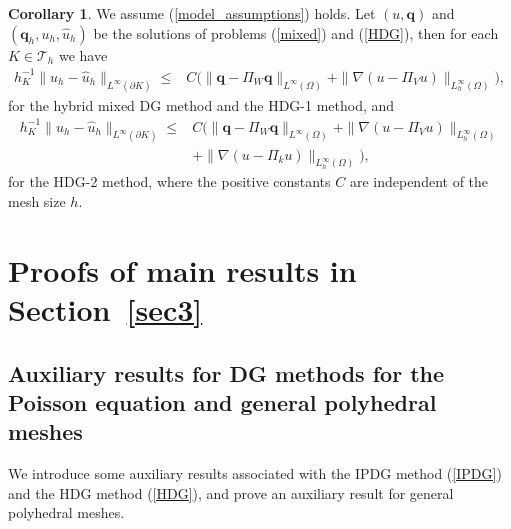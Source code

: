 \documentclass[1996/10/24]{amsart}
\theoremstyle{definition}
\newtheorem{corollary}[theorem]{Corollary}
\numberwithin{equation}{section}
\begin{document}
\begin{corollary}\label{mn-HDG-1}
We assume (\ref{model_assumptions}) holds.
Let $(u,{\bm q})$ and $({\bm q}_h,u_h,\widehat{u}_h)$ be the solutions of problems (\ref{mixed}) and (\ref{HDG}), then for each $K\in\mathcal{T}_h$ we have
\begin{align}
h_K^{-1}\|u_h-\widehat{u}_h\|_{L^{\infty}(\partial K)}\leq & C\Big(\|{\bm q}-\Pi_W{\bm q}\|_{L^{\infty}(\Omega)}
+\|\nabla(u-\Pi_Vu)\|_{L_h^{\infty}(\Omega)}\Big),\label{mn-HDG-1:1}
\end{align}
for the hybrid mixed DG method and the HDG-1 method, and
\begin{align}
h_K^{-1}\|u_h-\widehat{u}_h\|_{L^{\infty}(\partial K)}\leq & C\Big(\|{\bm q}-\Pi_W{\bm q}\|_{L^{\infty}(\Omega)}
+\|\nabla(u-\Pi_Vu)\|_{L_h^{\infty}(\Omega)}\nonumber\\
&+\|\nabla(u-\Pi_ku)\|_{L_h^{\infty}(\Omega)}\Big),\label{mn-HDG-1:2}
\end{align}
for the HDG-2 method, where the positive constants $C$ are independent of the mesh size $h$.
\end{corollary}

\section{Proofs of main results in Section~\ref{sec3}}\label{sec4}

\subsection{Auxiliary results for DG methods for the Poisson equation and general polyhedral meshes}

We introduce some auxiliary results associated with the IPDG method (\ref{IPDG}) and the HDG method (\ref{HDG}),
and prove an auxiliary result for general polyhedral meshes.
\end{document}
